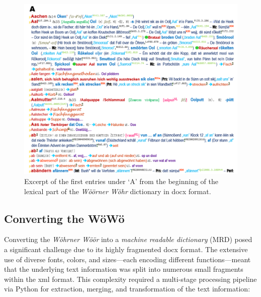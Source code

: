 \documentclass[11pt]{article}
\begin{document}
\begin{figure}
    \centering
    \includegraphics[width=1\linewidth]{img/woewoe_excerpt.png}
    \caption{Excerpt of the first entries under ‘A’ from the beginning of the lexical part of the \emph{Wöörner Wöhr} dictionary in docx format.}
    \label{fig:enter-label}
\end{figure}

\subsection{Converting the WöWö}

Converting the \emph{Wöhrner Wöör} into a \emph{machine readable dictionary} (MRD) posed a significant challenge due to its highly fragmented docx format. The extensive use of diverse fonts, colors, and sizes—each encoding different functions—meant that the underlying text information was split into numerous small fragments within the xml format. This complexity required a multi-stage processing pipeline via Python for extraction, merging, and transformation of the text information:
\end{document}
